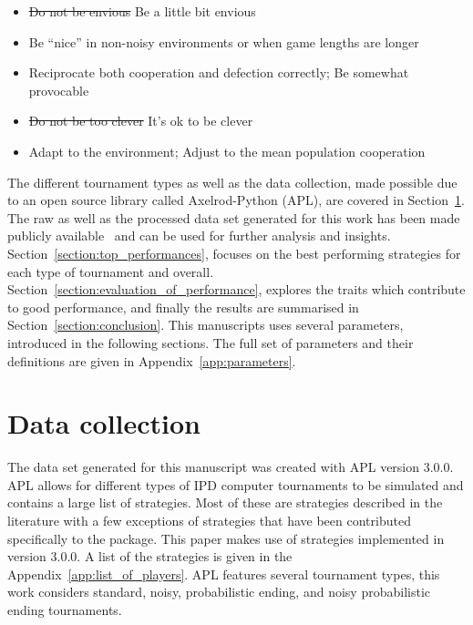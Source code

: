 \documentclass{article}
\newcommand{\numberofstrategies}{}
\begin{document}
\begin{itemize}
    \item \st{Do not be envious} Be a little bit envious
    \item Be ``nice'' in non-noisy environments or when game lengths are longer
    \item Reciprocate both cooperation and defection correctly; Be somewhat provocable
    \item \st{Do not be too clever} It's ok to be clever
    \item Adapt to the environment; Adjust to the mean population cooperation
\end{itemize}

The different tournament types as well as the data collection, made
possible due to an open source library called Axelrod-Python (APL),
are covered in Section~\ref{section:data_collection}. The raw as well as the processed
data set generated
for this work has been made publicly available~\cite{data, raw_data} and can be used
for further analysis and insights.
Section~\ref{section:top_performances}, focuses on the best performing
strategies for each type of tournament and overall.
Section~\ref{section:evaluation_of_performance}, explores the traits which
contribute to good performance, and finally the results are summarised in
Section~\ref{section:conclusion}. This manuscripts uses several parameters,
introduced in the following sections. The full set of
parameters and their definitions are given in Appendix~\ref{app:parameters}.

\section{Data collection}\label{section:data_collection}

The data set generated for this manuscript was created with APL version 3.0.0.
APL allows for different types of IPD computer
tournaments to be simulated and contains a large list of strategies.
Most of these are strategies described in the literature with a few exceptions
of strategies that have been contributed specifically to the package. This
paper makes use of \numberofstrategies strategies implemented in version 3.0.0. A
list of the strategies is given in the Appendix~\ref{app:list_of_players}.
APL features several tournament types, this work considers
standard, noisy, probabilistic ending, and noisy probabilistic ending
tournaments.
\end{document}
